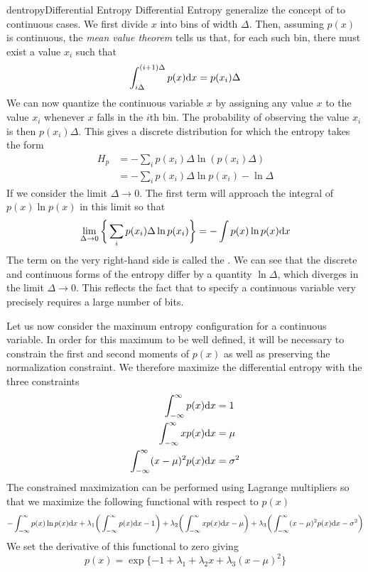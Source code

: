 \documentclass[9pt]{article}
\begin{document}
\begin{topic}{dentropy}{Differential Entropy}
Differential Entropy generalize the concept of  to continuous cases. We first divide $x$ into bins of width $\Delta$. Then, assuming $p(x)$ is continuous, the \textit{mean value theorem} tells us that, for each such bin, there must exist a value $x_i$ such that
\[
\int_{i\Delta}^{(i+1)\Delta} p(x)\mathrm{d} x = p(x_i)\Delta
\]
We can now quantize the continuous variable $x$ by assigning any value $x$ to the value $x_i$ whenever $x$ falls in the $i$th bin. The probability of observing the value $x_i$ is then $p(x_i)\Delta$. This gives a discrete distribution for which the entropy takes the form
\[
\begin{split}
H_{p} & = -\sum_i p(x_i) \Delta \ln(p(x_i)\Delta)\\
& = -\sum_i p(x_i)\Delta \ln p(x_i) - \ln\Delta
\end{split}
\]
If we consider the limit $\Delta \to 0$. The first term will approach the integral of $p(x)\ln p(x)$ in this limit so that 
\[
\lim_{\Delta \to 0}\bigg\{\sum_i p(x_i) \Delta \ln p(x_i) \bigg\} = -\int p(x) \ln p(x) \mathrm{d} x
\]
The term on the very right-hand side is called the \textit{\color{red}{differential entropy}}. We can see that the discrete and continuous forms of the entropy differ by a quantity $\ln \Delta$, which diverges in the limit $\Delta \to 0$. This reflects the fact that to specify a continuous variable very precisely requires a large number of bits.

Let us now consider the maximum entropy configuration for a continuous variable. In order for this maximum to be well defined, it will be necessary to constrain the first and second moments of $p(x)$ as well as preserving the normalization constraint. We therefore maximize the differential entropy with the three constraints
\[
\begin{split}
\int_{-\infty}^{\infty} p(x)\mathrm{d} x & = 1\\
\int_{-\infty}^{\infty} xp(x)\mathrm{d} x & = \mu\\
\int_{-\infty}^{\infty} (x-\mu)^2 p(x)\mathrm{d} x & = \sigma^2\\
\end{split}
\]
The constrained maximization can be performed using Lagrange multipliers so that we maximize the following functional with respect to $p(x)$
\[
-\int_{-\infty}^{\infty} p(x) \ln p(x) \mathrm{d} x + \lambda_1\bigg(\int_{-\infty}^{\infty} p(x)\mathrm{d} x - 1\bigg) + \lambda_2\bigg(\int_{-\infty}^{\infty} xp(x)\mathrm{d} x - \mu\bigg) + \lambda_3\bigg(\int_{-\infty}^{\infty} (x-\mu)^2 p(x)\mathrm{d} x -\sigma^2\bigg)
\]
We set the derivative of this functional to zero giving
\[
p(x) = \exp\{-1+\lambda_1+\lambda_2x+\lambda_3(x-\mu)^2\}
\]


\end{topic}
\end{document}
